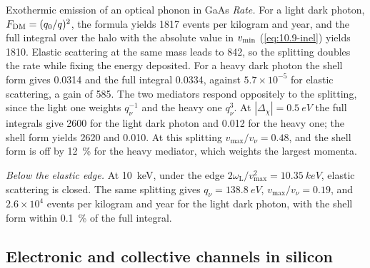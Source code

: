 \begin{workedexample}{Exothermic emission of an optical phonon in GaAs}
\emph{Rate.} For a light dark photon, $F_{\mathrm{DM}} = (q_0/q)^2$, the formula yields 1817 events per kilogram and year, and the full integral over the halo with the absolute value in $v_{\mathrm{min}}$ (\cref{eq:10.9-inel}) yields 1810. Elastic scattering at the same mass leads to 842, so the splitting doubles the rate while fixing the energy deposited. For a heavy dark photon the shell form gives 0.0314 and the full integral 0.0334, against $5.7\times10^{-5}$ for elastic scattering, a gain of 585. The two mediators respond oppositely to the splitting, since the light one weights $q_\nu^{-1}$ and the heavy one $q_\nu^3$. At $|\Delta_\chi| = \SI{0.5}{eV}$ the full integrals give 2600 for the light dark photon and 0.012 for the heavy one; the shell form yields 2620 and 0.010. At this splitting $v_{\mathrm{max}}/v_\nu = 0.48$, and the shell form is off by \SI{12}{\percent} for the heavy mediator, which weights the largest momenta.

\emph{Below the elastic edge.} At \SI{10}{keV}, under the edge $2\omega_{\mathrm{L}}/v_{\mathrm{max}}^2 = \SI{10.35}{keV}$, elastic scattering is closed. The same splitting gives $q_\nu = \SI{138.8}{eV}$, $v_{\mathrm{max}}/v_\nu = 0.19$, and $2.6\times10^4$ events per kilogram and year for the light dark photon, with the shell form within \SI{0.1}{\percent} of the full integral.
\end{workedexample}

\subsection{Electronic and collective channels in silicon}\label{sec:17.3-silicon}

